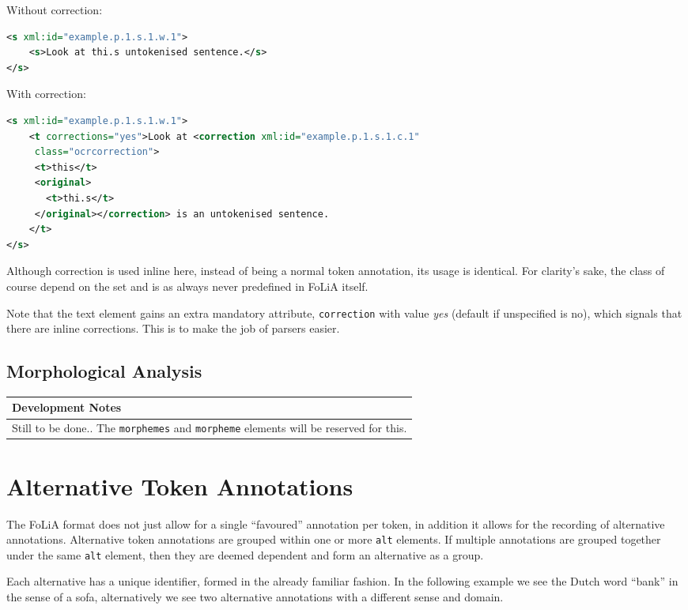 \documentclass[a4paper,12pt]{report}
\newenvironment{devnotes}
{\newpage
\begin{center}
    \begin{tabular}[h!]{|p{0.8\textwidth}|}
    \hline
    {\bf Development Notes}\\\hline}
{   \\\hline
    \end{tabular}
\end{center}}
\begin{document}
Without correction:

\begin{lstlisting}[language=xml]
<s xml:id="example.p.1.s.1.w.1">
    <s>Look at thi.s untokenised sentence.</s>
</s>            
\end{lstlisting}

With correction:

\begin{lstlisting}[language=xml]
<s xml:id="example.p.1.s.1.w.1">
    <t corrections="yes">Look at <correction xml:id="example.p.1.s.1.c.1"
     class="ocrcorrection">
     <t>this</t>
     <original>
       <t>thi.s</t>
     </original></correction> is an untokenised sentence.
    </t>
</s>                         
\end{lstlisting}

Although correction is used inline here, instead of being a normal token annotation, its usage is identical. For clarity's sake, the class of course depend on the set and is as always never predefined in FoLiA itself.

Note that the text element gains an extra mandatory attribute, \texttt{correction} with value \emph{yes} (default if unspecified is no), which signals that there are inline corrections. This is to make the job of parsers easier.

\subsection{Morphological Analysis}

\begin{devnotes}
Still to be done.. The \texttt{morphemes} and \texttt{morpheme} elements will be reserved for this.
\end{devnotes}


\section{Alternative Token Annotations}

The FoLiA format does not just allow for a single ``favoured'' annotation per token, in addition it allows for the recording of alternative annotations. Alternative token annotations are grouped within one or more \texttt{alt} elements. If multiple annotations are grouped together under the same \texttt{alt} element, then they are deemed dependent and form an alternative as a group.

Each alternative has a unique identifier, formed in the already familiar fashion. In the following example we see the Dutch word ``bank'' in the sense of a sofa, alternatively we see two alternative annotations with a different sense and domain.
\end{document}

